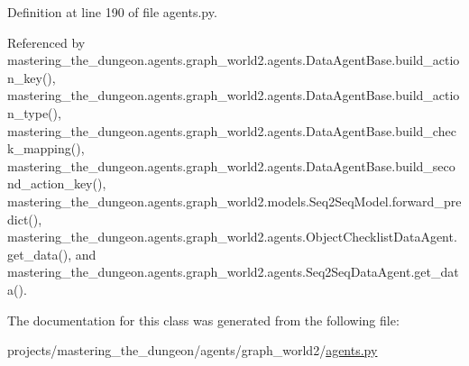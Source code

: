 Definition at line 190 of file agents.\+py.



Referenced by mastering\+\_\+the\+\_\+dungeon.\+agents.\+graph\+\_\+world2.\+agents.\+Data\+Agent\+Base.\+build\+\_\+action\+\_\+key(), mastering\+\_\+the\+\_\+dungeon.\+agents.\+graph\+\_\+world2.\+agents.\+Data\+Agent\+Base.\+build\+\_\+action\+\_\+type(), mastering\+\_\+the\+\_\+dungeon.\+agents.\+graph\+\_\+world2.\+agents.\+Data\+Agent\+Base.\+build\+\_\+check\+\_\+mapping(), mastering\+\_\+the\+\_\+dungeon.\+agents.\+graph\+\_\+world2.\+agents.\+Data\+Agent\+Base.\+build\+\_\+second\+\_\+action\+\_\+key(), mastering\+\_\+the\+\_\+dungeon.\+agents.\+graph\+\_\+world2.\+models.\+Seq2\+Seq\+Model.\+forward\+\_\+predict(), mastering\+\_\+the\+\_\+dungeon.\+agents.\+graph\+\_\+world2.\+agents.\+Object\+Checklist\+Data\+Agent.\+get\+\_\+data(), and mastering\+\_\+the\+\_\+dungeon.\+agents.\+graph\+\_\+world2.\+agents.\+Seq2\+Seq\+Data\+Agent.\+get\+\_\+data().



The documentation for this class was generated from the following file\+:\begin{DoxyCompactItemize}
\item 
projects/mastering\+\_\+the\+\_\+dungeon/agents/graph\+\_\+world2/\hyperlink{projects_2mastering__the__dungeon_2agents_2graph__world2_2agents_8py}{agents.\+py}\end{DoxyCompactItemize}
